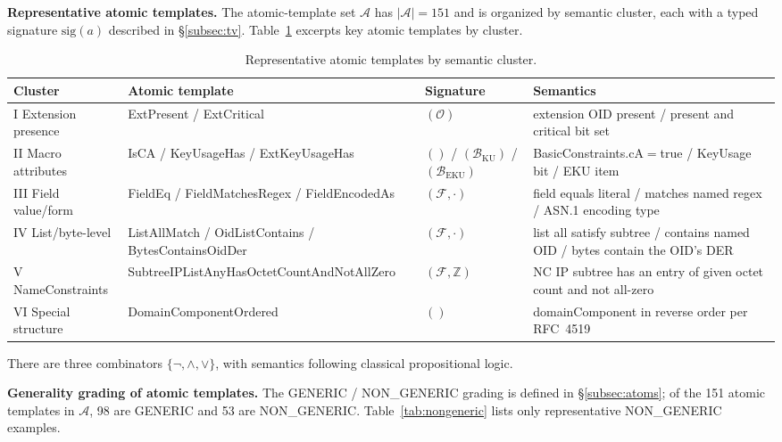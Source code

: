 \textbf{Representative atomic templates.} The atomic-template set $\mathcal{A}$
has $|\mathcal{A}|=151$ and is organized by semantic cluster, each with a typed
signature $\mathrm{sig}(a)$ described in \S\ref{subsec:tv}. Table~\ref{tab:atoms} excerpts
key atomic templates by cluster.

\begin{table}[tb]
\centering
\footnotesize
\caption{Representative atomic templates by semantic cluster.}
\label{tab:atoms}
\begin{tabularx}{\textwidth}{@{}l p{4.2cm} l X@{}}
\toprule
Cluster & Atomic template & Signature & Semantics \\
\midrule
I Extension presence & ExtPresent / ExtCritical &
  $(\mathcal{O})$ & extension OID present / present and critical bit set \\
II Macro attributes & IsCA / KeyUsageHas /
  ExtKeyUsageHas & $()$ / $(\mathcal{B}_{\mathrm{KU}})$ /
  $(\mathcal{B}_{\mathrm{EKU}})$ & BasicConstraints.cA$=$true / KeyUsage bit /
  EKU item \\
III Field value/form & FieldEq / FieldMatchesRegex /
  FieldEncodedAs & $(\mathcal{F}, \cdot)$ & field equals literal /
  matches named regex / ASN.1 encoding type \\
IV List/byte-level & ListAllMatch / OidListContains /
  BytesContainsOidDer & $(\mathcal{F}, \cdot)$ & list all satisfy
  subtree / contains named OID / bytes contain the OID's DER \\
V NameConstraints & SubtreeIPListAny\-HasOctetCount\-AndNotAllZero &
  $(\mathcal{F}, \mathbb{Z})$ & NC IP subtree has an entry of given octet count
  and not all-zero \\
VI Special structure & DomainComponentOrdered & $()$ &
  domainComponent in reverse order per RFC~4519 \\
\bottomrule
\end{tabularx}
\end{table}

There are three combinators $\{\neg, \wedge, \vee\}$, with semantics following
classical propositional logic.

\textbf{Generality grading of atomic templates.} The GENERIC / NON\_GENERIC
grading is defined in \S\ref{subsec:atoms}; of the 151 atomic templates in
$\mathcal{A}$, 98 are GENERIC and 53 are
NON\_GENERIC. Table~\ref{tab:nongeneric} lists only representative NON\_GENERIC
examples.

